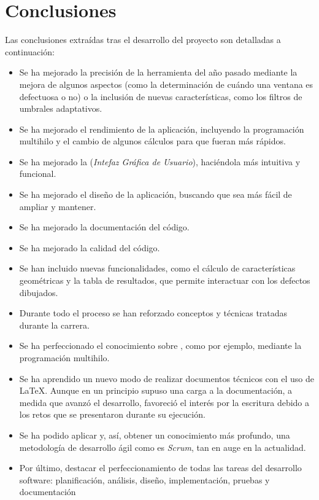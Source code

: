 \section{Conclusiones}
Las conclusiones extraídas tras el desarrollo del proyecto son detalladas a continuación:
\begin{itemize}
\item Se ha mejorado la precisión de la herramienta del año pasado mediante la mejora de algunos aspectos (como la determinación de cuándo una ventana es defectuosa o no) o la inclusión de nuevas características, como los filtros de umbrales adaptativos.
\item Se ha mejorado el rendimiento de la aplicación, incluyendo la programación multihilo y el cambio de algunos cálculos para que fueran más rápidos.
 \item Se ha mejorado la \gui{} (\textit{Intefaz Gráfica de Usuario}), haciéndola más intuitiva y funcional.
 \item Se ha mejorado el diseño de la aplicación, buscando que sea más fácil de ampliar y mantener.
 \item Se ha mejorado la documentación del código.
 \item Se ha mejorado la calidad del código.
 \item Se han incluido nuevas funcionalidades, como el cálculo de características geométricas y la tabla de resultados, que permite interactuar con los defectos dibujados.
 \item Durante todo el proceso se han reforzado conceptos y técnicas tratadas durante la carrera.
 \item Se ha perfeccionado el conocimiento sobre \java{}, como por ejemplo, mediante la programación multihilo.
 \item Se ha aprendido un nuevo modo de realizar documentos técnicos con el uso de \LaTeX{}. Aunque en un principio supuso una carga a la documentación, a medida que avanzó el desarrollo, favoreció el interés por la escritura debido a los retos que se presentaron durante su ejecución.
 \item Se ha podido aplicar y, así, obtener un conocimiento más profundo, una metodología de desarrollo ágil como es \textit{Scrum}, tan en auge en la actualidad.
 \item Por último, destacar el perfeccionamiento de todas las tareas del desarrollo software: planificación, análisis, diseño, implementación, pruebas y documentación
\end{itemize}

